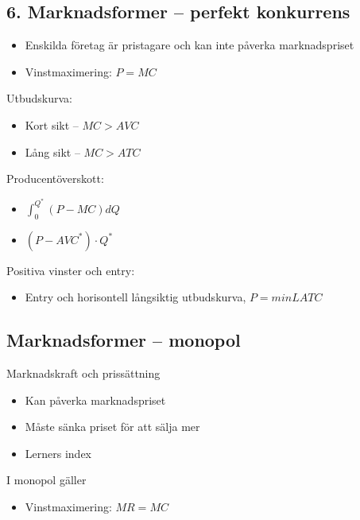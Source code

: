 \documentclass[12pt,a4paper]{article}
\begin{document}
{\subsection*{6. Marknadsformer -- perfekt konkurrens}
\begin{itemize}
    \item Enskilda företag är pristagare och kan inte påverka marknadspriset
    \item Vinstmaximering: $P = MC$
\end{itemize}

Utbudskurva:
\begin{itemize}
    \item Kort sikt -- $MC > AVC$
    \item Lång sikt -- $MC > ATC$
\end{itemize}

\noindent Producentöverskott:
\begin{itemize}
    \item $\int_{0}^{Q^*} (P - MC) dQ$
    \item $(P - AVC^*) \cdot Q^*$
\end{itemize}

\noindent Positiva vinster och entry:
\begin{itemize}
    \item Entry och horisontell långsiktig utbudskurva, $P = min LATC$
\end{itemize}

\subsection*{Marknadsformer -- monopol}
Marknadskraft och prissättning
\begin{itemize}
    \item Kan påverka marknadspriset
    \item Måste sänka priset för att sälja mer
    \item Lerners index
\end{itemize}

\noindent I monopol gäller
\begin{itemize}
    \item Vinstmaximering: $MR = MC$
\end{itemize}

\newpage

}
\end{document}
